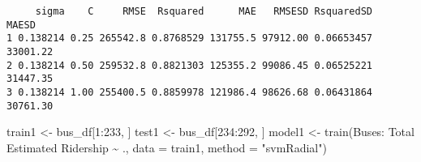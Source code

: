 \documentclass[
  letterpaper,
  DIV=11,
  numbers=noendperiod]{scrartcl}
\newenvironment{Shaded}{\begin{snugshade}}{\end{snugshade}}
\newcommand{\AttributeTok}[1]{\textcolor[rgb]{0.40,0.45,0.13}{#1}}
\newcommand{\DecValTok}[1]{\textcolor[rgb]{0.68,0.00,0.00}{#1}}
\newcommand{\FunctionTok}[1]{\textcolor[rgb]{0.28,0.35,0.67}{#1}}
\newcommand{\NormalTok}[1]{\textcolor[rgb]{0.00,0.23,0.31}{#1}}
\newcommand{\OtherTok}[1]{\textcolor[rgb]{0.00,0.23,0.31}{#1}}
\newcommand{\SpecialCharTok}[1]{\textcolor[rgb]{0.37,0.37,0.37}{#1}}
\newcommand{\StringTok}[1]{\textcolor[rgb]{0.13,0.47,0.30}{#1}}
\begin{document}
\begin{verbatim}
     sigma    C     RMSE  Rsquared      MAE   RMSESD RsquaredSD    MAESD
1 0.138214 0.25 265542.8 0.8768529 131755.5 97912.00 0.06653457 33001.22
2 0.138214 0.50 259532.8 0.8821303 125355.2 99086.45 0.06525221 31447.35
3 0.138214 1.00 255400.5 0.8859978 121986.4 98626.68 0.06431864 30761.30
\end{verbatim}

\begin{Shaded}
\begin{Highlighting}[]
\NormalTok{train1 }\OtherTok{\textless{}{-}}\NormalTok{ bus\_df[}\DecValTok{1}\SpecialCharTok{:}\DecValTok{233}\NormalTok{, ]}
\NormalTok{test1 }\OtherTok{\textless{}{-}}\NormalTok{ bus\_df[}\DecValTok{234}\SpecialCharTok{:}\DecValTok{292}\NormalTok{, ]}
\NormalTok{model1 }\OtherTok{\textless{}{-}} \FunctionTok{train}\NormalTok{(}\StringTok{\textasciigrave{}}\AttributeTok{Buses: Total Estimated Ridership}\StringTok{\textasciigrave{}} \SpecialCharTok{\textasciitilde{}}\NormalTok{ ., }\AttributeTok{data =}\NormalTok{ train1, }\AttributeTok{method =} \StringTok{"svmRadial"}\NormalTok{)}
\end{Highlighting}
\end{Shaded}
\end{document}
